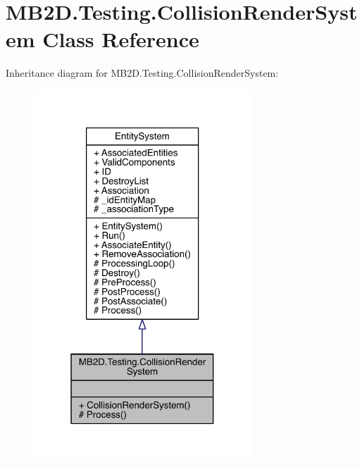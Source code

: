 \hypertarget{class_m_b2_d_1_1_testing_1_1_collision_render_system}{}\section{M\+B2\+D.\+Testing.\+Collision\+Render\+System Class Reference}
\label{class_m_b2_d_1_1_testing_1_1_collision_render_system}


Inheritance diagram for M\+B2\+D.\+Testing.\+Collision\+Render\+System\+:
\nopagebreak
\begin{figure}[H]
\begin{center}
\leavevmode
\includegraphics[width=232pt]{class_m_b2_d_1_1_testing_1_1_collision_render_system__inherit__graph}
\end{center}
\end{figure}


